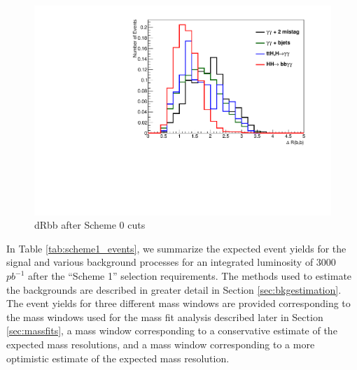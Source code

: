 \documentclass{cmspaper}
\begin{document}
\begin{figure}
\centering
\includegraphics[scale=0.45, angle=0]{figures/dRbb_s0_normalized.pdf}	
\caption{dRbb after Scheme 0 cuts}
\label{fig:dRbb_s0}
\end{figure}

In Table \ref{tab:scheme1_events}, we summarize the expected event yields for the signal and 
various background processes for an integrated luminosity of $3000$~$pb^{-1}$ after 
the ``Scheme 1'' selection requirements. The methods used to estimate the backgrounds
are described in greater detail in Section \ref{sec:bkgestimation}. The event yields
for three different mass windows are provided corresponding to the mass windows
used for the mass fit analysis described later in Section \ref{sec:massfits}, a mass window
corresponding to a conservative estimate of the expected mass resolutions, 
and a mass window corresponding to a more optimistic estimate of the expected mass resolution.
\end{document}
